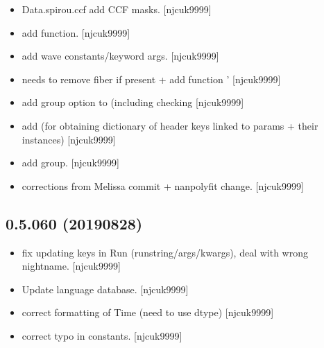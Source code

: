 \documentclass[a4paper,10pt,english]{report}
\begin{document}
\begin{itemize}
\item {} 
Data.spirou.ccf \sphinxhyphen{} add CCF masks. {[}njcuk9999{]}

\item {} 
 \sphinxhyphen{} add  function.
{[}njcuk9999{]}

\item {} 
 \sphinxhyphen{} add wave constants/keyword args. {[}njcuk9999{]}

\item {} 
 \sphinxhyphen{}  needs to remove fiber
if present + add function ’ {[}njcuk9999{]}

\item {} 
 \sphinxhyphen{} add group option to 
(including checking  {[}njcuk9999{]}

\item {} 
 \sphinxhyphen{} add  (for
obtaining dictionary of header keys linked to params + their
instances) {[}njcuk9999{]}

\item {} 
 \sphinxhyphen{} add group. {[}njcuk9999{]}

\item {} 
 \sphinxhyphen{} corrections from Melissa commit + nanpolyfit
change. {[}njcuk9999{]}

\end{itemize}


\subsection{0.5.060 (2019\sphinxhyphen{}08\sphinxhyphen{}28)}
\label{\detokenize{misc/changelog:id102}}\begin{itemize}
\item {} 
 \sphinxhyphen{} fix updating keys in Run
(runstring/args/kwargs), deal with wrong nightname. {[}njcuk9999{]}

\item {} 
Update language database. {[}njcuk9999{]}

\item {} 
 \sphinxhyphen{} correct formatting of Time (need to use dtype)
{[}njcuk9999{]}

\item {} 
 \sphinxhyphen{} correct typo in
constants. {[}njcuk9999{]}

\end{itemize}
\end{document}
